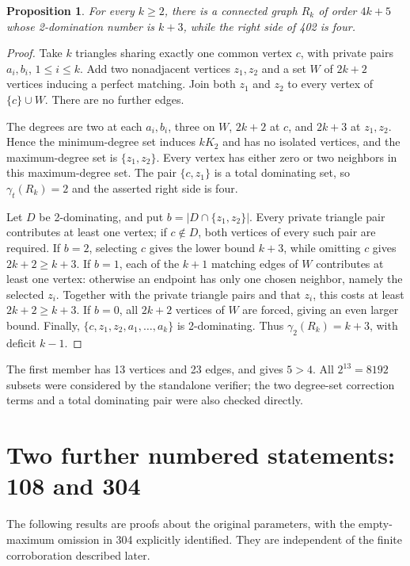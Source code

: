 \documentclass[11pt,a4paper]{article}
\newtheorem{proposition}[theorem]{Proposition}
\theoremstyle{remark}
\begin{document}
\begin{proposition}\label{r7:family402}
For every $k\ge2$, there is a connected graph $R_k$ of order $4k+5$
whose 2-domination number is $k+3$, while the right side of 402 is four.
\end{proposition}
\begin{proof}
Take $k$ triangles sharing exactly one common vertex $c$, with
private pairs $a_i,b_i$, $1\le i\le k$. Add two nonadjacent vertices
$z_1,z_2$ and a set $W$ of $2k+2$ vertices inducing a perfect
matching. Join both $z_1$ and $z_2$ to every vertex of $\{c\}\cup W$.
There are no further edges.

The degrees are two at each $a_i,b_i$, three on $W$, $2k+2$ at $c$,
and $2k+3$ at $z_1,z_2$. Hence the minimum-degree set induces
$kK_2$ and has no isolated vertices, and the maximum-degree set is
$\{z_1,z_2\}$. Every vertex has either zero or two neighbors in
this maximum-degree set. The pair $\{c,z_1\}$ is a total dominating
set, so $\gamma_t(R_k)=2$ and the asserted right side is four.

Let $D$ be 2-dominating, and put $b=|D\cap\{z_1,z_2\}|$.
Every private triangle pair contributes at least one vertex; if
$c\notin D$, both vertices of every such pair are required.
If $b=2$, selecting $c$ gives the lower bound $k+3$, while omitting
$c$ gives $2k+2\ge k+3$. If $b=1$, each of the $k+1$ matching
edges of $W$ contributes at least one vertex: otherwise an endpoint
has only one chosen neighbor, namely the selected $z_i$.
Together with the private triangle pairs and that $z_i$, this costs
at least $2k+2\ge k+3$. If $b=0$, all $2k+2$ vertices of $W$ are
forced, giving an even larger bound. Finally,
$\{c,z_1,z_2,a_1,\ldots,a_k\}$ is 2-dominating. Thus
$\gamma_2(R_k)=k+3$, with deficit $k-1$.
\end{proof}

The first member has 13 vertices and 23 edges, and gives $5>4$.
All $2^{13}=8192$ subsets were considered by the standalone verifier;
the two degree-set correction terms and a total dominating pair were
also checked directly.


\section{Two further numbered statements: 108 and 304}
\label{r8:main}
The following results are proofs about the original parameters, with
the empty-maximum omission in 304 explicitly identified. They are
independent of the finite corroboration described later.
\end{document}
